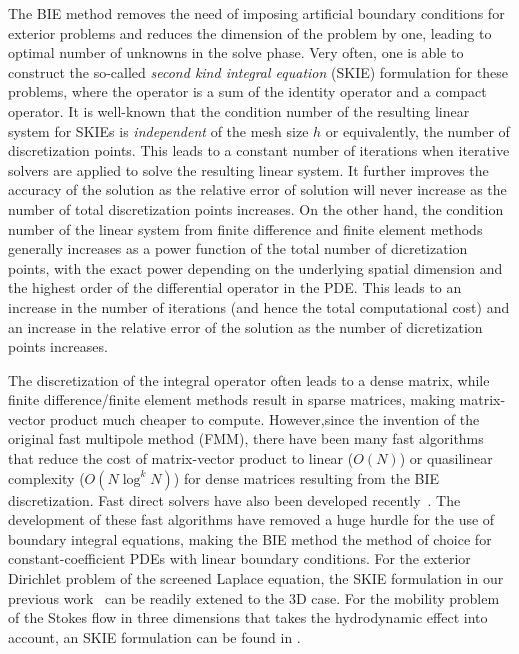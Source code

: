The BIE method removes the need of imposing artificial boundary conditions
for exterior problems
and reduces the dimension of the problem by one, leading to optimal number of unknowns
in the solve phase. Very often, one is able to construct the so-called
{\it second kind integral equation} (SKIE) formulation for these problems,
where the operator is a sum of the identity operator and a compact operator.
It is well-known that the condition number of the
resulting linear system for SKIEs is {\it independent} of the mesh size $h$ or equivalently,
the number of discretization points. This leads to
a constant number of iterations when iterative solvers are applied to solve
the resulting linear system. It further
improves the accuracy of the solution as the relative error of solution
will never increase as the number of total discretization points increases.
On the other hand, the condition
number of the linear system from finite difference and finite element methods generally
increases as a power function of the total number of dicretization points, with
the exact power depending on the underlying spatial dimension and the highest
order of the differential operator in the PDE. This leads to an increase in the number
of iterations (and hence the total computational cost) and an increase in the relative
error of the solution as the number of dicretization points increases.

The discretization of the integral operator often leads to a dense matrix,
while finite difference/finite element methods result in sparse matrices,
making matrix-vector product much cheaper to compute. However,since the invention
of the original fast multipole method (FMM)\cite{fmm5}, there
have been many fast algorithms~\cite{fmm1,fmm2,fmm3,fmm4,fmm6,fmm7,fmm8}
that reduce the cost of matrix-vector product
to linear ($O(N)$) or quasilinear complexity ($O(N \log^kN)$) for dense matrices resulting
from the BIE discretization.
Fast direct solvers have also been developed
recently~\cite{fds1,fds2,fds3,fds4,fds5,fds6,fds7,fds8,ho2016cpam2,ho2016cpam1,minden2016,minden2017siammms}.
The development of these fast algorithms have removed a huge
hurdle for the use of boundary integral equations, making the BIE method the method
of choice for constant-coefficient PDEs with linear boundary conditions. For the exterior
Dirichlet problem of the screened Laplace equation, the SKIE formulation in our previous
work~\cite{Fu2018_SIAM} can be readily extened to the 3D case. For the mobility problem
of the Stokes flow in three dimensions that
takes the hydrodynamic effect into account, an SKIE formulation
can be found in \cite{manasthesis}.

